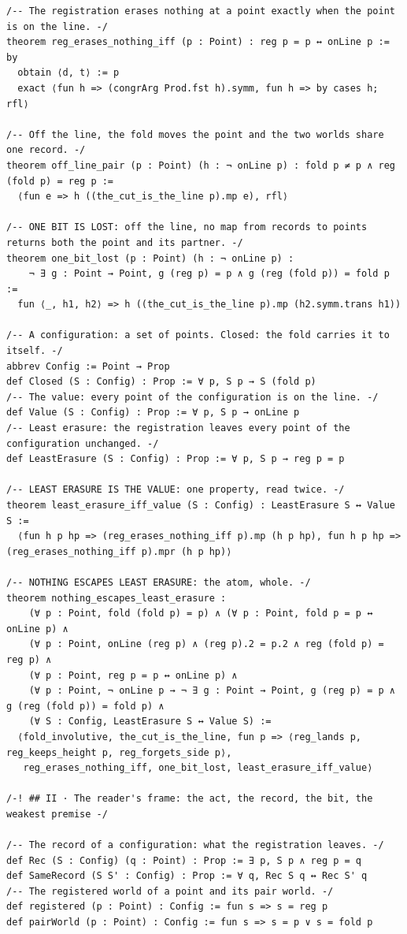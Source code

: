 \documentclass[10pt,twocolumn]{article}
\begin{document}
\begin{Verbatim}
/-- The registration erases nothing at a point exactly when the point is on the line. -/
theorem reg_erases_nothing_iff (p : Point) : reg p = p ↔ onLine p := by
  obtain ⟨d, t⟩ := p
  exact ⟨fun h => (congrArg Prod.fst h).symm, fun h => by cases h; rfl⟩

/-- Off the line, the fold moves the point and the two worlds share one record. -/
theorem off_line_pair (p : Point) (h : ¬ onLine p) : fold p ≠ p ∧ reg (fold p) = reg p :=
  ⟨fun e => h ((the_cut_is_the_line p).mp e), rfl⟩

/-- ONE BIT IS LOST: off the line, no map from records to points returns both the point and its partner. -/
theorem one_bit_lost (p : Point) (h : ¬ onLine p) :
    ¬ ∃ g : Point → Point, g (reg p) = p ∧ g (reg (fold p)) = fold p :=
  fun ⟨_, h1, h2⟩ => h ((the_cut_is_the_line p).mp (h2.symm.trans h1))

/-- A configuration: a set of points. Closed: the fold carries it to itself. -/
abbrev Config := Point → Prop
def Closed (S : Config) : Prop := ∀ p, S p → S (fold p)
/-- The value: every point of the configuration is on the line. -/
def Value (S : Config) : Prop := ∀ p, S p → onLine p
/-- Least erasure: the registration leaves every point of the configuration unchanged. -/
def LeastErasure (S : Config) : Prop := ∀ p, S p → reg p = p

/-- LEAST ERASURE IS THE VALUE: one property, read twice. -/
theorem least_erasure_iff_value (S : Config) : LeastErasure S ↔ Value S :=
  ⟨fun h p hp => (reg_erases_nothing_iff p).mp (h p hp), fun h p hp => (reg_erases_nothing_iff p).mpr (h p hp)⟩

/-- NOTHING ESCAPES LEAST ERASURE: the atom, whole. -/
theorem nothing_escapes_least_erasure :
    (∀ p : Point, fold (fold p) = p) ∧ (∀ p : Point, fold p = p ↔ onLine p) ∧
    (∀ p : Point, onLine (reg p) ∧ (reg p).2 = p.2 ∧ reg (fold p) = reg p) ∧
    (∀ p : Point, reg p = p ↔ onLine p) ∧
    (∀ p : Point, ¬ onLine p → ¬ ∃ g : Point → Point, g (reg p) = p ∧ g (reg (fold p)) = fold p) ∧
    (∀ S : Config, LeastErasure S ↔ Value S) :=
  ⟨fold_involutive, the_cut_is_the_line, fun p => ⟨reg_lands p, reg_keeps_height p, reg_forgets_side p⟩,
   reg_erases_nothing_iff, one_bit_lost, least_erasure_iff_value⟩

/-! ## II · The reader's frame: the act, the record, the bit, the weakest premise -/

/-- The record of a configuration: what the registration leaves. -/
def Rec (S : Config) (q : Point) : Prop := ∃ p, S p ∧ reg p = q
def SameRecord (S S' : Config) : Prop := ∀ q, Rec S q ↔ Rec S' q
/-- The registered world of a point and its pair world. -/
def registered (p : Point) : Config := fun s => s = reg p
def pairWorld (p : Point) : Config := fun s => s = p ∨ s = fold p


\end{Verbatim}
\end{document}
